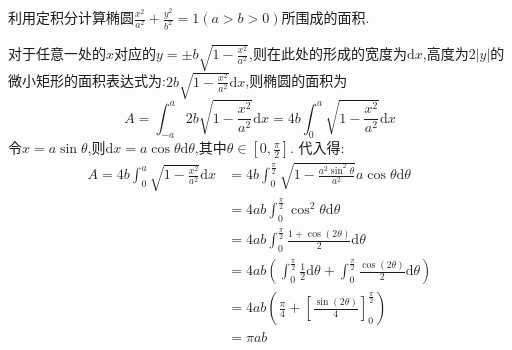 \begin{questions}
	\question 利用定积分计算椭圆$\frac{x^2}{a^2} + \frac{y^2}{b^2} = 1 (a > b > 0)$所围成的面积.
	\begin{solution}
		对于任意一处的$x$对应的$y=\pm b\sqrt{1 -
				\frac{x^2}{a^2}}$,则在此处的形成的宽度为$\mathrm{d}x$,高度为$2|y|$的微小矩形的面积表达式为:$2b\sqrt{1-\frac{x^2}{a^2}}\mathrm{d}x$,则椭圆的面积为
		\begin{equation*}
			A = \int_{-a}^{a}2b\sqrt{1-\frac{x^2}{a^2}}\mathrm{d}x = 4b\int_{0}^{a}\sqrt{1-\frac{x^2}{a^2}}\mathrm{d}x
		\end{equation*}
		令$x=a\sin\theta$,则$\mathrm{d}x = a\cos\theta\mathrm{d}\theta$,其中$\theta \in [0, \frac\pi2]$.
		代入得:
		\begin{align*}
			A = 4b\int_{0}^{a}\sqrt{1-\frac{x^2}{a^2}}\mathrm{d}x
			 & = 4b\int_0^{\frac\pi2}\sqrt{1 -
			\frac{a^2\sin^2\theta}{a^2}}a\cos\theta\mathrm{d}\theta                              \\
			 & = 4ab\int_0^{\frac\pi2}\cos^2\theta\mathrm{d}\theta                               \\
			 & = 4ab\int_0^{\frac\pi2}\frac{1+\cos(2\theta)}{2}\mathrm{d}\theta                  \\
			 & = 4ab\left(\int_0^{\frac\pi2}\frac12\mathrm{d}\theta +
			\int_0^{\frac\pi2}\frac{\cos(2\theta)}{2}\mathrm{d}\theta\right)                     \\
			 & = 4ab\left(\frac\pi4  + \left[\frac{\sin(2\theta)}{4}\right]_0^{\frac\pi2}\right) \\
			 & = \pi ab
		\end{align*}
	\end{solution}

\end{questions}
